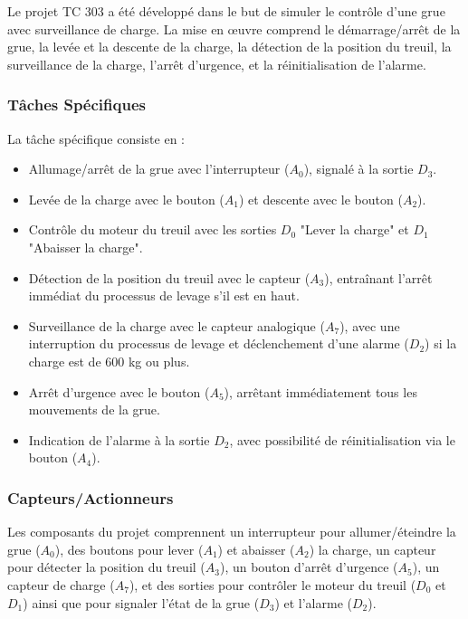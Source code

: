 \documentclass[a4paper,12pt]{report}
\begin{document}
Le projet TC 303 a été développé dans le but de simuler le contrôle d'une grue avec surveillance de charge. La mise en œuvre comprend le démarrage/arrêt de la grue, la levée et la descente de la charge, la détection de la position du treuil, la surveillance de la charge, l'arrêt d'urgence, et la réinitialisation de l'alarme.

\subsubsection{Tâches Spécifiques}

La tâche spécifique consiste en :
\begin{itemize}
    \item Allumage/arrêt de la grue avec l'interrupteur (\(A_0\)), signalé à la sortie \(D_3\).
    \item Levée de la charge avec le bouton (\(A_1\)) et descente avec le bouton (\(A_2\)).
    \item Contrôle du moteur du treuil avec les sorties \(D_0\) "Lever la charge" et \(D_1\) "Abaisser la charge".
    \item Détection de la position du treuil avec le capteur (\(A_3\)), entraînant l'arrêt immédiat du processus de levage s'il est en haut.
    \item Surveillance de la charge avec le capteur analogique (\(A_7\)), avec une interruption du processus de levage et déclenchement d'une alarme (\(D_2\)) si la charge est de 600 kg ou plus.
    \item Arrêt d'urgence avec le bouton (\(A_5\)), arrêtant immédiatement tous les mouvements de la grue.
    \item Indication de l'alarme à la sortie \(D_2\), avec possibilité de réinitialisation via le bouton (\(A_4\)).
\end{itemize}

\subsubsection{Capteurs/Actionneurs}

Les composants du projet comprennent un interrupteur pour allumer/éteindre la grue (\(A_0\)), des boutons pour lever (\(A_1\)) et abaisser (\(A_2\)) la charge, un capteur pour détecter la position du treuil (\(A_3\)), un bouton d'arrêt d'urgence (\(A_5\)), un capteur de charge (\(A_7\)), et des sorties pour contrôler le moteur du treuil (\(D_0\) et \(D_1\)) ainsi que pour signaler l'état de la grue (\(D_3\)) et l'alarme (\(D_2\)).
\end{document}
